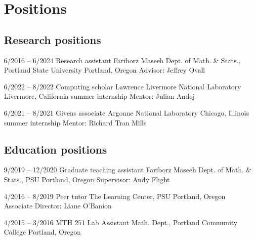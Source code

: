 \section{Positions}

\subsection{Research positions}

    \cventry
    {6/2016 -- 6/2024}
    {Research assistant}
    {Fariborz Maseeh Dept. of Math. \& Stats., Portland State University}
    {Portland, Oregon}
    {}
    {Advisor: Jeffrey Ovall}

    \cventry
    {6/2022 -- 8/2022}
    {Computing scholar}
    {Lawrence Livermore National Laboratory}
    {Livermore, California}
    {summer internship}
    {Mentor: Julian Andej}

    \cventry
    {6/2021 -- 8/2021}
    {Givens associate}
    {Argonne National Laboratory}
    {Chicago, Illinois}
    {summer internship}
    {Mentor: Richard Tran Mills}

\subsection{Education positions}

    \cventry
    {9/2019 -- 12/2020}
    {Graduate teaching assistant}
    {Fariborz Maseeh Dept. of Math. \& Stats., PSU}
    {Portland, Oregon}
    {}
    {Supervisor: Andy Flight}

    \cventry
    {4/2016 -- 8/2019}
    {Peer tutor}
    {The Learning Center, PSU}
    {Portland, Oregon}
    {}
    {Associate Director: Liane O'Banion}

    \cventry
    {4/2015 -- 3/2016}
    {MTH 251 Lab Assistant}
    {Math. Dept., Portland Community College}
    {Portland, Oregon}
    {}
    {}

